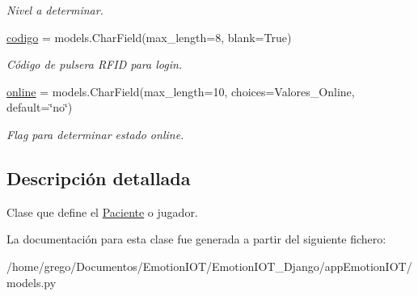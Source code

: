 \begin{DoxyCompactItemize}
\begin{DoxyCompactList}\small\item\em Nivel a determinar. \end{DoxyCompactList}\item 
\hyperlink{classappEmotionIOT_1_1models_1_1Paciente_a8fcfd97ed4a3d6afd3121246ac6369eb}{codigo} = models.\+Char\+Field(max\+\_\+length=8, blank=True)\hypertarget{classappEmotionIOT_1_1models_1_1Paciente_a8fcfd97ed4a3d6afd3121246ac6369eb}{}\label{classappEmotionIOT_1_1models_1_1Paciente_a8fcfd97ed4a3d6afd3121246ac6369eb}

\begin{DoxyCompactList}\small\item\em Código de pulsera R\+F\+ID para login. \end{DoxyCompactList}\item 
\hyperlink{classappEmotionIOT_1_1models_1_1Paciente_a1eed0c763e309f0b4fb69092297874a0}{online} = models.\+Char\+Field(max\+\_\+length=10, choices=Valores\+\_\+\+Online, default=\char`\"{}no\char`\"{})\hypertarget{classappEmotionIOT_1_1models_1_1Paciente_a1eed0c763e309f0b4fb69092297874a0}{}\label{classappEmotionIOT_1_1models_1_1Paciente_a1eed0c763e309f0b4fb69092297874a0}

\begin{DoxyCompactList}\small\item\em Flag para determinar estado online. \end{DoxyCompactList}\end{DoxyCompactItemize}


\subsection{Descripción detallada}
Clase que define el \hyperlink{classappEmotionIOT_1_1models_1_1Paciente}{Paciente} o jugador. 

La documentación para esta clase fue generada a partir del siguiente fichero\+:\begin{DoxyCompactItemize}
\item 
/home/grego/\+Documentos/\+Emotion\+I\+O\+T/\+Emotion\+I\+O\+T\+\_\+\+Django/app\+Emotion\+I\+O\+T/models.\+py\end{DoxyCompactItemize}

